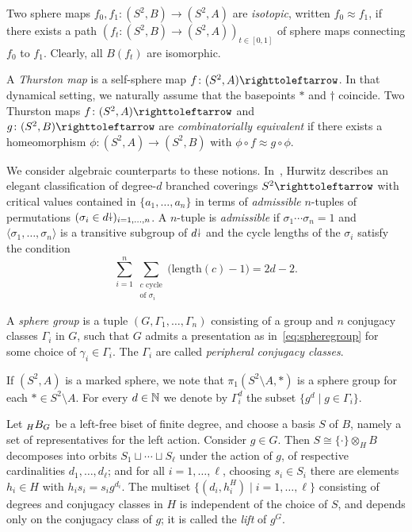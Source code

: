 \documentclass{amsart}
\begin{document}
Two sphere maps $f_0,f_1\colon(S^2,B)\to(S^2,A)$ are \emph{isotopic},
written $f_0\approx f_1$, if there exists a path
$(f_t\colon(S^2,B)\to(S^2,A))_{t\in[0,1]}$ of sphere maps connecting
$f_0$ to $f_1$. Clearly, all $B(f_t)$ are isomorphic.

A \emph{Thurston map} is a self-sphere map
$f\colon(S^2,A)\selfmap$. In that dynamical setting, we naturally
assume that the basepoints $*$ and $\dagger$ coincide. Two Thurston
maps $f\colon(S^2,A)\selfmap$ and $g\colon(S^2,B)\selfmap$ are
\emph{combinatorially equivalent} if there exists a homeomorphism
$\phi\colon(S^2,A)\to(S^2,B)$ with $\phi\circ f\approx g\circ\phi$.

We consider algebraic counterparts to these
notions. In~\cite{hurwitz:ramifiedsurfaces}, Hurwitz describes an
elegant classification of degree-$d$ branched coverings $S^2\selfmap$
with critical values contained in $\{a_1,\dots,a_n\}$ in terms of
\emph{admissible} $n$-tuples of permutations
$(\sigma_i\in d{\stackrel{\downarrow}{\smash.}})_{i=1,\dots,n}$. A $n$-tuple is \emph{admissible}
if $\sigma_1\cdots\sigma_n=1$ and
$\langle\sigma_1,\dots,\sigma_n\rangle$ is a transitive subgroup of
$d{\stackrel{\downarrow}{\smash.}}$ and the cycle lengths of the $\sigma_i$ satisfy the condition
\begin{equation}\label{eq:riemannhurwitz}
  \sum_{i=1}^n\sum_{\substack{c\text{ cycle}\\\text{of }\sigma_i}}\bigl(\text{length}(c)-1\bigr)=2d-2.
\end{equation}

\begin{defn}\label{defn:sphere groups}
  A \emph{sphere group} is a tuple $(G,\Gamma_1,\dots,\Gamma_n)$
  consisting of a group and $n$ conjugacy classes $\Gamma_i$ in $G$,
  such that $G$ admits a presentation as in~\eqref{eq:spheregroup} for
  some choice of $\gamma_i\in\Gamma_i$. The $\Gamma_i$ are called
  \emph{peripheral conjugacy classes}.
\end{defn}
If $(S^2,A)$ is a marked sphere, we note that
$\pi_1(S^2\setminus A,*)$ is a sphere group for each
$*\in S^2\setminus A$. For every $d\in{\mathbb N}$ we denote by $\Gamma_i^d$
the subset $\{g^d \mid g\in\Gamma_i\}$.

Let $\subscript H B_G$ be a left-free biset of finite degree, and choose a
basis $S$ of $B$, namely a set of representatives for the left
action. Consider $g\in G$. Then $S\cong\{\cdot\}\otimes_H B$
decomposes into orbits $S_1\sqcup\cdots\sqcup S_\ell$ under the action
of $g$, of respective cardinalities $d_1,\dots,d_\ell$; and for all
$i=1,\dots,\ell$, choosing $s_i\in S_i$ there are elements $h_i\in H$
with $h_is_i=s_i g^{d_i}$. The multiset
$\{(d_i,h_i^H)\mid i=1,\dots,\ell\}$ consisting of degrees and
conjugacy classes in $H$ is independent of the choice of $S$, and
depends only on the conjugacy class of $g$; it is called the
\emph{lift} of $g^G$.
\end{document}
